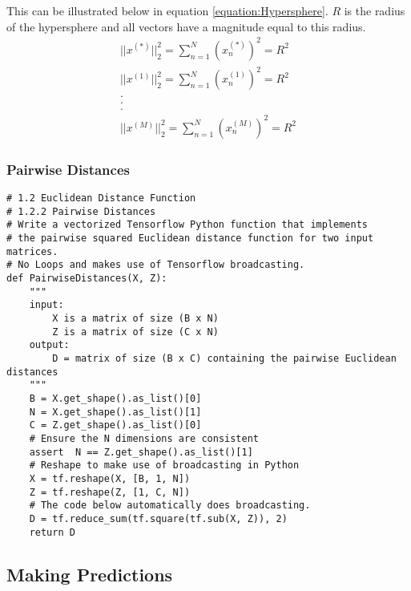 \documentclass[a4paper,12pt]{article}
\begin{document}
This can be illustrated below in equation \ref{equation:Hypersphere}. 
$R$ is the radius of the hypersphere and all vectors have a magnitude equal to this radius. 
\begin{equation}
\label{equation:Hypersphere}
\begin{split}
||x^{(*)}||_{2}^{2} = \sum_{n=1}^{N} (x^{(*)}_{n})^{2} = R^{2} \\
||x^{(1)}||_{2}^{2} = \sum_{n=1}^{N} (x^{(1)}_{n})^{2} = R^{2} \\
. \\
. \\
. \\
||x^{(M)}||_{2}^{2} = \sum_{n=1}^{N} (x^{(M)}_{n})^{2} = R^{2}
\end{split}
\end{equation}

\subsubsection{Pairwise Distances}
\begin{verbatim}
# 1.2 Euclidean Distance Function 
# 1.2.2 Pairwise Distances
# Write a vectorized Tensorflow Python function that implements
# the pairwise squared Euclidean distance function for two input matrices.
# No Loops and makes use of Tensorflow broadcasting.
def PairwiseDistances(X, Z):
    """
    input:
        X is a matrix of size (B x N)
        Z is a matrix of size (C x N)
    output:
        D = matrix of size (B x C) containing the pairwise Euclidean distances
    """
    B = X.get_shape().as_list()[0]
    N = X.get_shape().as_list()[1]
    C = Z.get_shape().as_list()[0]
    # Ensure the N dimensions are consistent 
    assert  N == Z.get_shape().as_list()[1]
    # Reshape to make use of broadcasting in Python
    X = tf.reshape(X, [B, 1, N])
    Z = tf.reshape(Z, [1, C, N])
    # The code below automatically does broadcasting. 
    D = tf.reduce_sum(tf.square(tf.sub(X, Z)), 2)
    return D
\end{verbatim}

\subsection{Making Predictions}
\end{document}
